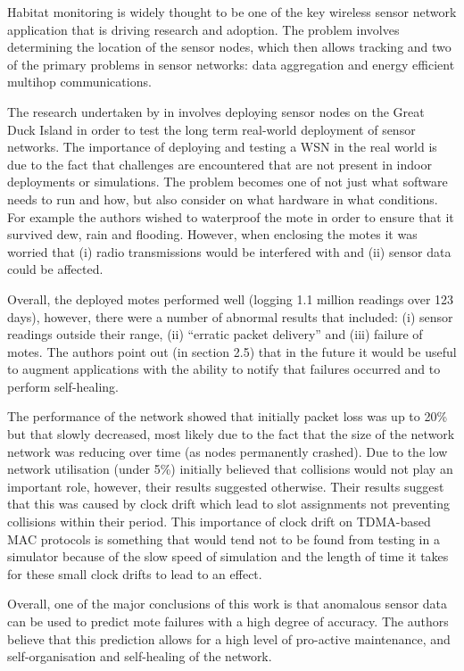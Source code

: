 Habitat monitoring is widely thought to be one of the key wireless sensor network application that is driving research and adoption. The problem involves determining the location of the sensor nodes, which then allows tracking \cite{Cerpa:2001:HMA:844193.844196} and two of the primary problems in sensor networks: data aggregation and energy efficient multihop communications.

The research undertaken by \citeauthor{SzewczykPMC04} in \cite{SzewczykPMC04} involves deploying sensor nodes on the Great Duck Island in order to test the long term real-world deployment of sensor networks. The importance of deploying and testing a WSN in the real world is due to the fact that challenges are encountered that are not present in indoor deployments or simulations. The problem becomes one of not just what software needs to run and how, but also consider on what hardware in what conditions. For example the authors wished to waterproof the mote in order to ensure that it survived dew, rain and flooding. However, when enclosing the motes it was worried that (i) radio transmissions would be interfered with and (ii) sensor data could be affected.

Overall, the deployed motes performed well (logging 1.1 million readings over 123 days), however, there were a number of abnormal results that included: (i) sensor readings outside their range, (ii) ``erratic packet delivery'' and (iii) failure of motes. The authors point out (in section 2.5) that in the future it would be useful to augment applications with the ability to notify that failures occurred and to perform self-healing.

The performance of the network showed that initially packet loss was up to 20\% but that slowly decreased, most likely due to the fact that the size of the network network was reducing over time (as nodes permanently crashed). Due to the low network utilisation (under 5\%) \citeauthor{SzewczykPMC04} initially believed that collisions would not play an important role, however, their results suggested otherwise. Their results suggest that this was caused by clock drift which lead to slot assignments not preventing collisions within their period. This importance of clock drift on TDMA-based MAC protocols is something that would tend not to be found from testing in a simulator because of the slow speed of simulation and the length of time it takes for these small clock drifts to lead to an effect.

Overall, one of the major conclusions of this work is that anomalous sensor data can be used to predict mote failures with a high degree of accuracy. The authors believe that this prediction allows for a high level of pro-active maintenance, and self-organisation and self-healing of the network.

